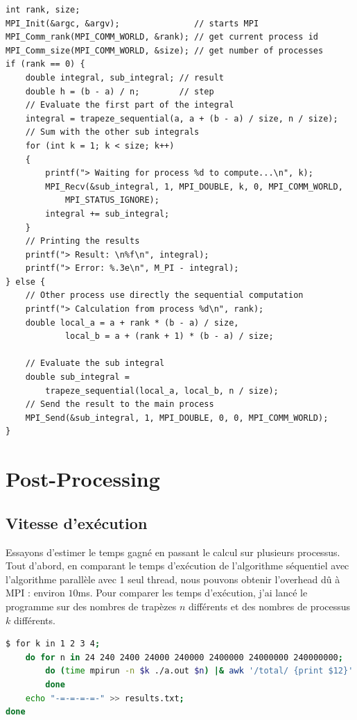 \documentclass{article}
\begin{document}
\begin{lstlisting}[style=ccode, morekeywords={f, MPI_Recv, MPI_Send, trapeze_sequential}]
int rank, size;
MPI_Init(&argc, &argv);               // starts MPI
MPI_Comm_rank(MPI_COMM_WORLD, &rank); // get current process id
MPI_Comm_size(MPI_COMM_WORLD, &size); // get number of processes
if (rank == 0) {
    double integral, sub_integral; // result
    double h = (b - a) / n;        // step
    // Evaluate the first part of the integral
    integral = trapeze_sequential(a, a + (b - a) / size, n / size);
    // Sum with the other sub integrals
    for (int k = 1; k < size; k++)
    {
        printf("> Waiting for process %d to compute...\n", k);
        MPI_Recv(&sub_integral, 1, MPI_DOUBLE, k, 0, MPI_COMM_WORLD,
            MPI_STATUS_IGNORE);
        integral += sub_integral;
    }
    // Printing the results
    printf("> Result: \n%f\n", integral);
    printf("> Error: %.3e\n", M_PI - integral);
} else {
    // Other process use directly the sequential computation
    printf("> Calculation from process %d\n", rank);
    double local_a = a + rank * (b - a) / size,
            local_b = a + (rank + 1) * (b - a) / size;

    // Evaluate the sub integral
    double sub_integral =
        trapeze_sequential(local_a, local_b, n / size);
    // Send the result to the main process
    MPI_Send(&sub_integral, 1, MPI_DOUBLE, 0, 0, MPI_COMM_WORLD);
}
\end{lstlisting}

\newpage

\section{Post-Processing}

\subsection{Vitesse d'exécution}
Essayons d'estimer le temps gagné en passant le calcul sur plusieurs processus.
Tout d'abord, en comparant le temps d'exécution de l'algorithme séquentiel avec l'algorithme parallèle avec 1 seul thread, nous pouvons obtenir l'overhead dû à MPI : environ $10$ms. Pour comparer les temps d'exécution, j'ai lancé le programme sur des nombres de trapèzes $n$ différents et des nombres de processus $k$ différents.
\begin{lstlisting}[language=bash, keywordstyle=\color{black}\bf]
$ for k in 1 2 3 4;
    do for n in 24 240 2400 24000 240000 2400000 24000000 240000000;
        do (time mpirun -n $k ./a.out $n) |& awk '/total/ {print $12}' >> results.txt
        done
    echo "-=-=-=-=-" >> results.txt;
done
\end{lstlisting}
\end{document}
